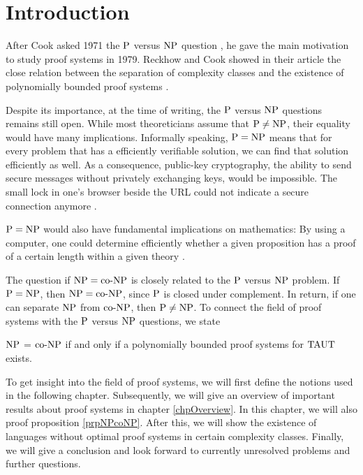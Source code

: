 \chapter{Introduction}
  After Cook asked 1971 the \(\P\) versus \(\NP\) question \cite{C71}, he gave the main motivation to study proof systems in 1979. Reckhow and Cook showed in their article the close relation between the separation of complexity classes and the existence of polynomially bounded proof systems \cite{CR79}.

  Despite its importance, at the time of writing, the \(\P\) versus \(\NP\) questions remains still open. While most theoreticians assume that \(\P \neq \NP\), their equality would have many implications. Informally speaking, \(\P = \NP\) means that for every problem that has a efficiently verifiable solution, we can find that solution efficiently as well. As a consequence, public-key cryptography, the ability to send secure messages without privately exchanging keys, would be impossible. The small lock in one's browser beside the URL could not indicate a secure connection anymore \cite{F09}.

  \(\P = \NP\) would also have fundamental implications on mathematics: By using a computer, one could determine efficiently whether a given proposition has a proof of a certain length within a given theory \cite{CR79}.

  The question if \(\NP = \coNP\) is closely related to the \(\P\) versus \(\NP\) problem. If \(\P = \NP\), then \(\NP = \coNP\), since \(\P\) is closed under complement. In return, if one can separate \(\NP\) from \(\coNP\), then \(\P \neq \NP\). To connect the field of proof systems with the \(\P\) versus \(\NP\) questions, we state

  \begin{proposition} \label{prpNPcoNP}
    \(\NP\) = \(\coNP\) if and only if a polynomially bounded proof systems for \(\TAUT\) exists.
  \end{proposition}

  To get insight into the field of proof systems, we will first define the notions used in the following chapter. Subsequently, we will give an overview of important results about proof systems in chapter \ref{chpOverview}. In this chapter, we will also proof proposition \ref{prpNPcoNP}. After this, we will show the existence of languages without optimal proof systems in certain complexity classes. Finally, we will give a conclusion and look forward to currently unresolved problems and further questions.

